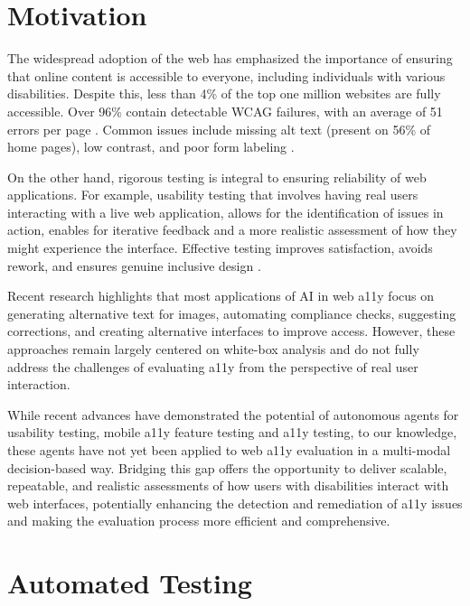 
\section{Motivation}

The widespread adoption of the web has emphasized the importance of ensuring that online content is accessible to everyone, including individuals with various disabilities\cite{abu2023web}. Despite this, less than 4\% of the top one million websites are fully accessible. Over 96\% contain detectable \ac{WCAG} failures, with an average of 51 errors per page \cite{webaimmillion2025}. Common issues include missing alt text (present on 56\% of home pages), low contrast, and poor form labeling \cite{audioeye2024}.

On the other hand, rigorous testing is integral to ensuring reliability of web applications. For example, usability testing that involves having real users interacting with a live web application, allows for the identification of issues in action, enables for iterative feedback and a more realistic assessment of how they might experience the interface. Effective testing improves satisfaction, avoids rework, and ensures genuine inclusive design \cite{accessdesign2025}.

Recent research highlights that most applications of \ac{AI} in web \ac{a11y} focus on generating alternative text for images, automating compliance checks, suggesting corrections, and creating alternative interfaces to improve access\cite{vera2025towards}. However, these approaches remain largely centered on white-box analysis and do not fully address the challenges of evaluating \ac{a11y} from the perspective of real user interaction. 

While recent advances have demonstrated the potential of autonomous agents for usability testing\cite{lu2025uxagent}, mobile \ac{a11y} feature testing\cite{taeb2024axnav} and a11y testing\cite{zhong2025screenaudit}, to our knowledge, these agents have not yet been applied to web \ac{a11y} evaluation in a multi-modal decision-based way. Bridging this gap offers the opportunity to deliver scalable, repeatable, and realistic assessments of how users with disabilities interact with web interfaces, potentially enhancing the detection and remediation of \ac{a11y} issues and making the evaluation process more efficient and comprehensive.

\section{Automated Testing}

